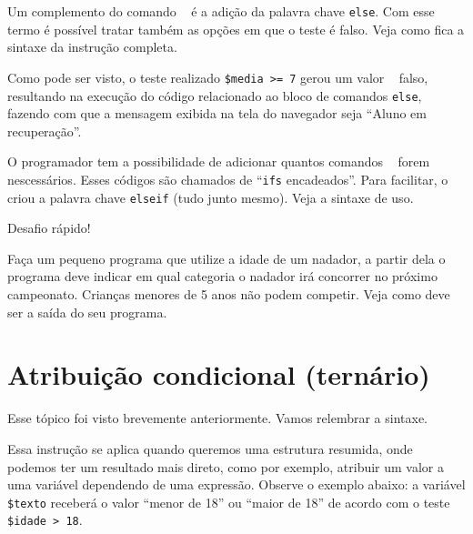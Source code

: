 Um complemento do comando \comandoif~ é a adição da palavra chave \texttt{else}. Com esse termo
é possível tratar também as opções em que o teste é falso. Veja como fica a sintaxe da instrução
completa.



Como pode ser visto, o teste realizado \texttt{\$media >= 7} gerou um valor \booleano~
falso, resultando na execução do código relacionado ao bloco de comandos \texttt{else},
fazendo com que a mensagem exibida na tela do navegador seja ``Aluno em recuperação''.

O programador tem a possibilidade de adicionar quantos comandos \comandoifelse~
forem nescessários. Esses códigos são chamados de ``\texttt{ifs} encadeados''. 
Para facilitar, o \php~ criou a palavra chave \texttt{elseif} (tudo junto mesmo).
Veja a sintaxe de uso.



{\Large Desafio rápido!}

Faça um pequeno programa que utilize a idade de um nadador, a partir dela
o programa deve indicar em qual categoria o nadador irá concorrer no próximo
campeonato. Crianças menores de 5 anos não podem competir. 
Veja como deve ser a saída do seu programa. 


\section{Atribuição condicional (ternário)}
\label{atribuicao-condicional}

Esse tópico foi visto brevemente anteriormente. Vamos relembrar a sintaxe.



Essa instrução se aplica quando queremos uma estrutura resumida, onde podemos ter um 
resultado mais direto, como por exemplo, atribuir um valor a uma variável dependendo de uma
expressão. Observe o exemplo abaixo: a variável \texttt{\$texto} receberá o valor 
``menor de 18'' ou ``maior de 18'' de acordo com o teste \texttt{\$idade > 18}.


 
